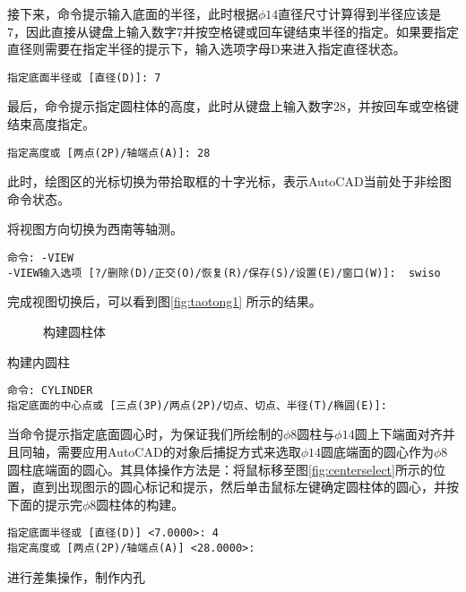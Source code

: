 \begin{procedure}
接下来，命令提示输入底面的半径，此时根据$\phi 14$直径尺寸计算得到半径应该是7，因此直接从键盘上输入数字7并按空格键或回车键结束半径的指定。如果要指定直径则需要在指定半径的提示下，输入选项字母D来进入指定直径状态。
\begin{lstlisting}
指定底面半径或 [直径(D)]: 7
\end{lstlisting}
最后，命令提示指定圆柱体的高度，此时从键盘上输入数字28，并按回车或空格键结束高度指定。
\begin{lstlisting}
指定高度或 [两点(2P)/轴端点(A)]: 28
\end{lstlisting}
此时，绘图区的光标切换为带拾取框的十字光标，表示AutoCAD当前处于非绘图命令状态。
\item 将视图方向切换为西南等轴测。
\begin{lstlisting}
命令: -VIEW
-VIEW输入选项 [?/删除(D)/正交(O)/恢复(R)/保存(S)/设置(E)/窗口(W)]:  swiso
\end{lstlisting}
完成视图切换后，可以看到图\ref{fig:taotong1} 所示的结果。
\begin{figure}[htbp]
\centering
{}\hspace{20pt}
\hspace{20pt}
\caption{构建圆柱体}
\end{figure}

\item 构建内圆柱
\begin{lstlisting}
命令: CYLINDER
指定底面的中心点或 [三点(3P)/两点(2P)/切点、切点、半径(T)/椭圆(E)]:
\end{lstlisting}
当命令提示指定底面圆心时，为保证我们所绘制的$\phi 8$圆柱与$\phi 14$圆上下端面对齐并且同轴，需要应用AutoCAD的对象后捕捉方式来选取$\phi 14$圆底端面的圆心作为$\phi 8$圆柱底端面的圆心。其具体操作方法是：将鼠标移至图\ref{fig:centerselect}所示的位置，直到出现图示的圆心标记和提示，然后单击鼠标左键确定圆柱体的圆心，并按下面的提示完$\phi 8$圆柱体的构建。
\begin{lstlisting}
指定底面半径或 [直径(D)] <7.0000>: 4
指定高度或 [两点(2P)/轴端点(A)] <28.0000>:
\end{lstlisting}


\item 进行差集操作，制作内孔


\end{procedure}
